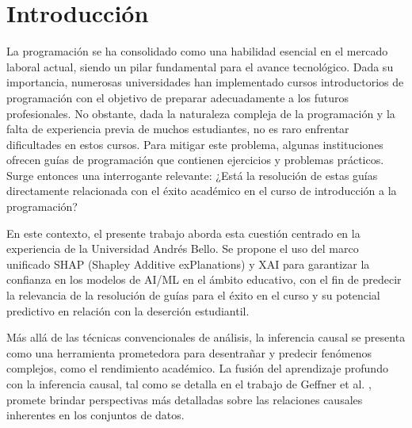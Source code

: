 \hypertarget{Introducción}{%
\section{Introducción}\label{Introducción}}

La programación se ha consolidado como una habilidad esencial en el mercado laboral actual, siendo un pilar fundamental para el avance tecnológico. Dada su importancia, numerosas universidades han implementado cursos introductorios de programación con el objetivo de preparar adecuadamente a los futuros profesionales. No obstante, dada la naturaleza compleja de la programación y la falta de experiencia previa de muchos estudiantes, no es raro enfrentar dificultades en estos cursos. Para mitigar este problema, algunas instituciones ofrecen guías de programación que contienen ejercicios y problemas prácticos. Surge entonces una interrogante relevante: ¿Está la resolución de estas guías directamente relacionada con el éxito académico en el curso de introducción a la programación?

En este contexto, el presente trabajo aborda esta cuestión centrado en la experiencia de la Universidad Andrés Bello. Se propone el uso del marco unificado SHAP (Shapley Additive exPlanations) y XAI para garantizar la confianza en los modelos de AI/ML en el ámbito educativo, con el fin de predecir la relevancia de la resolución de guías para el éxito en el curso y su potencial predictivo en relación con la deserción estudiantil.

Más allá de las técnicas convencionales de análisis, la inferencia causal se presenta como una herramienta prometedora para desentrañar y predecir fenómenos complejos, como el rendimiento académico. La fusión del aprendizaje profundo con la inferencia causal, tal como se detalla en el trabajo de Geffner et al. \cite{geffner2022deep}, promete brindar perspectivas más detalladas sobre las relaciones causales inherentes en los conjuntos de datos.